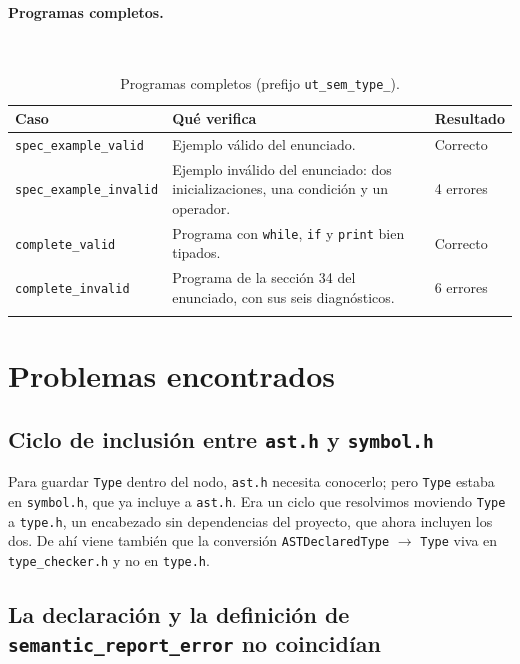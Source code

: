 \documentclass[12pt,letterpaper]{article}
\begin{document}
\paragraph{Programas completos.}\mbox{}\\[0.3em]
\begin{longtable}{|p{5.2cm}|p{7.6cm}|p{3.4cm}|}
\hline
\textbf{Caso} & \textbf{Qué verifica} & \textbf{Resultado} \\ \hline \endhead
\footnotesize\texttt{spec\_example\_valid} & \small Ejemplo válido del enunciado. & \small Correcto \\ \hline
\footnotesize\texttt{spec\_example\_invalid} & \small Ejemplo inválido del enunciado: dos inicializaciones, una condición y un operador. & \small 4 errores \\ \hline
\footnotesize\texttt{complete\_valid} & \small Programa con \texttt{while}, \texttt{if} y \texttt{print} bien tipados. & \small Correcto \\ \hline
\footnotesize\texttt{complete\_invalid} & \small Programa de la sección 34 del enunciado, con sus seis diagnósticos. & \small 6 errores \\ \hline
\caption{Programas completos (prefijo \texttt{ut\_sem\_type\_}).}
\end{longtable}

\section*{Problemas encontrados}\label{sec:problemas}

\subsection*{Ciclo de inclusión entre \texttt{ast.h} y \texttt{symbol.h}}

Para guardar \texttt{Type} dentro del nodo, \texttt{ast.h} necesita conocerlo; pero \texttt{Type} estaba en
\texttt{symbol.h}, que ya incluye a \texttt{ast.h}. Era un ciclo que resolvimos moviendo \texttt{Type} a
\texttt{type.h}, un encabezado sin dependencias del proyecto, que ahora incluyen los dos. De ahí viene también
que la conversión \texttt{ASTDeclaredType} $\to$ \texttt{Type} viva en \texttt{type\_checker.h} y no en
\texttt{type.h}.

\subsection*{La declaración y la definición de \texttt{semantic\_report\_error} no coincidían}
\end{document}
